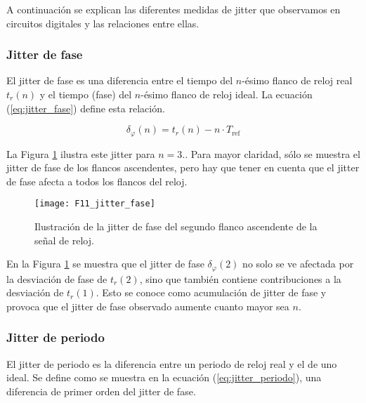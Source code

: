             A continuación se explican las diferentes medidas de jitter que observamos en circuitos digitales y las relaciones entre ellas.

            \subsubsection{Jitter de fase}

                El jitter de fase es una diferencia entre el tiempo del $n$-ésimo flanco de reloj real $t_{r}(n)$ y el tiempo (fase) del $n$-ésimo flanco de reloj ideal. La ecuación (\ref{eq:jitter_fase}) define esta relación.

                \begin{equation}
                    \delta_{\varphi}(n) = t_{r}(n) - n \cdot T_{\text{ref}}
                    \label{eq:jitter_fase}
                \end{equation}
                
                La Figura \ref{fig:F11_jitter_fase} ilustra este jitter para $n = 3.$. Para mayor claridad, sólo se muestra el jitter de fase de los flancos ascendentes, pero hay que tener en cuenta que el jitter de fase afecta a todos los flancos del reloj.

                \begin{figure}[hbtp]
                    \caption{Ilustración de la jitter de fase del segundo flanco ascendente de la señal de reloj. \cite{Petura2019}}
                    \centering
                    \texttt{[image: F11\_jitter\_fase]}
                    \label{fig:F11_jitter_fase}
                \end{figure}

                En la Figura \ref{fig:F11_jitter_fase} se muestra que el jitter de fase $\delta_{\varphi}(2)$ no solo se ve afectada por la desviación de fase de $t_{r}(2)$, sino que también contiene contribuciones a la desviación de $t_{r}(1)$. Esto se conoce como acumulación de jitter de fase y provoca que el jitter de fase observado aumente cuanto mayor sea $n$.

            \subsubsection{Jitter de periodo}

                El jitter de periodo es la diferencia entre un periodo de reloj real y el de uno ideal. Se define como se muestra en la ecuación (\ref{eq:jitter_periodo}), una diferencia de primer orden del jitter de fase.

